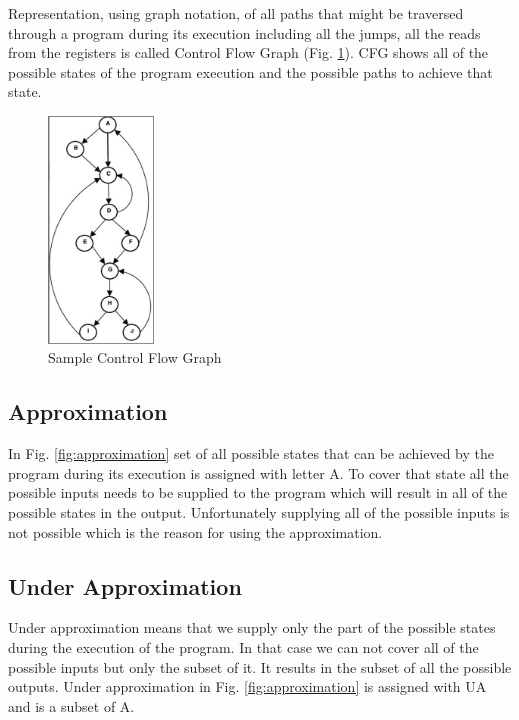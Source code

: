 \documentclass[a4paper, 12pt, journal, onecolumn]{IEEEtran}
\begin{document}
Representation, using graph notation, of all paths that might be traversed through a program during its execution including all the jumps, all the reads from the registers is called Control Flow Graph (Fig. \ref{fig:CFG}). CFG shows all of the possible states of the program execution and the possible paths to achieve that state.


\begin{figure}[ht]
    \centering
    \captionsetup{justification=centering}
    \includegraphics[width=0.25\textwidth]{CFG.png}
    \caption{Sample Control Flow Graph \cite{a3} }
    \label{fig:CFG}
\end{figure}


\subsection{Approximation}

In Fig. \ref{fig:approximation} set of all possible states that can be achieved by the program during its execution is assigned with letter A. To cover that state all the possible inputs needs to be supplied to the program which will result in all of the possible states in the output. Unfortunately supplying all of the possible inputs is not possible which is the reason for using the approximation.

\subsection{Under Approximation}

Under approximation means that we supply only the part of the possible states during the execution of the program. In that case we can not cover all of the possible inputs but only the subset of it. It results in the subset of all the possible outputs. Under approximation in Fig. \ref{fig:approximation} is assigned with UA and is a subset of A. \cite{a4}
\end{document}
